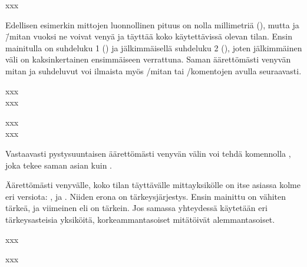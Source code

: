 \begin{tulossis}
  x\hspace{0mm plus 1fill}x\hspace{0mm plus 2fill}x
\end{tulossis}

Edellisen esimerkin mittojen luonnollinen pituus on nolla millimetriä
(\koodi{0mm}), mutta  ja  \=/mitan vuoksi ne
voivat venyä ja täyttää koko käytettävissä olevan tilan. Ensin
mainitulla on suhdeluku 1 () ja jälkimmäisellä suhdeluku 2
(), joten jälkimmäinen väli on kaksinkertainen ensimmäiseen
verrattuna. Saman äärettömästi venyvän mitan ja suhdeluvut voi ilmaista
myös \-/mitan tai \-/komentojen
avulla seuraavasti.

\pagebreak[3]

\begin{koodilohkosis}
  xxx \\
  x\hfill x\hfill\hfill x
\end{koodilohkosis}

\begin{tulossis}
  xxx \\
  x\hfill x\hfill\hfill x
\end{tulossis}

Vastaavasti pystysuuntaisen äärettömästi venyvän välin voi tehdä
komennolla , joka tekee saman asian kuin .

Äärettömästi venyvälle, koko tilan täyttävälle mittayksikölle on itse
asiassa kolme eri versiota: ,  ja .
Niiden erona on tärkeysjärjestys. Ensin mainittu  on vähiten
tärkeä, ja viimeinen eli  on tärkein. Jos samassa
yhteydessä käytetään eri tär\-keys\-as\-tei\-sia yksiköitä,
korkeammantasoiset mitätöivät alemmantasoiset.

\pagebreak[3]

\begin{koodilohkosis}
  x\hspace{0mm plus 1filll}x\hspace{0mm plus 1fill}x
\end{koodilohkosis}

\begin{tulossis}
  x\hspace{0mm plus 1filll}x\hspace{0mm plus 1fill}x
\end{tulossis}

